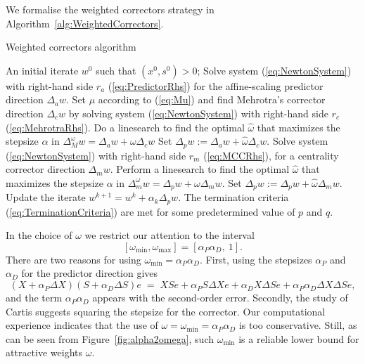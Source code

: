 We formalise the weighted correctors strategy in 
Algorithm~\ref{alg:WeightedCorrectors}.

\begin{algorithm}[ht]
  \caption{Weighted correctors algorithm}
    \begin{algorithmic}[0]  \label{alg:WeightedCorrectors}
      \REQUIRE An initial iterate $w^0$ such that $(x^0, s^0) > 0$;
      \smallskip
      \REPEAT
        \STATE Solve system (\ref{eq:NewtonSystem}) with right-hand side $r_a$
	       (\ref{eq:PredictorRhs}) for the affine-scaling predictor
	       direction $\Delta_a w$.
        \smallskip
        \STATE Set $\mu$ according to (\ref{eq:Mu}) and find Mehrotra's
               corrector direction $\Delta_c w$ by solving system
               (\ref{eq:NewtonSystem}) with right-hand side $r_c$
               (\ref{eq:MehrotraRhs}).
        \smallskip
        \STATE Do a linesearch to find the optimal $\hat\omega$ that
               maximizes the stepsize $\alpha$ in
               $\Delta^\omega_M w = \Delta_a w +\omega\Delta_c w$
        \smallskip
	\STATE Set $\Delta_p w := \Delta_a w +\hat\omega\Delta_c w$. 
        \smallskip
           \smallskip
           \STATE Solve system (\ref{eq:NewtonSystem}) with right-hand side
                  $r_m$ (\ref{eq:MCCRhs}), for a centrality
                 corrector direction $\Delta_m w$.
           \smallskip
	   \STATE Perform a linesearch to find the optimal $\hat\omega$ that
                  maximizes the stepsize $\alpha$ in
                  $\Delta^\omega_m w = \Delta_p w +\omega\Delta_m w$.
           \smallskip
           \STATE Set $\Delta_p w := \Delta_p w +\hat\omega\Delta_m w$.
           \smallskip
        \ENDWHILE
        \STATE Update the iterate $w^{k+1} = w^k + \alpha_k\Delta_p w$.
        \smallskip
      \UNTIL The termination criteria (\ref{eq:TerminationCriteria}) are met
             for some predetermined value of $p$ and $q$.
  \end{algorithmic}
\end{algorithm}

In the choice of $\omega$ we restrict our attention to
the interval 
\[
  [\omega_{\min},\omega_{\max}]=[\alpha_P\alpha_D,\ 1]. 
\]
There are two reasons for using  $\omega_{\min} = \alpha_P\alpha_D$. 
First, using the stepsizes $\alpha_P$ and $\alpha_D$ for the predictor
direction gives 
\[
(X + \alpha_P \Delta X) (S + \alpha_D \Delta S) e 
\;=\; XSe + \alpha_P S\Delta Xe + \alpha_D X\Delta Se 
          + \alpha_P\alpha_D \Delta X\Delta S e,
\]
and the term $\alpha_P\alpha_D$ appears with the second-order error. 
Secondly, the study of Cartis \cite{Cartis04} suggests squaring 
the stepsize for the corrector. Our computational experience indicates 
that the use of $\omega = \omega_{\min} = \alpha_P\alpha_D$
is too conservative. 
Still, as can be seen from Figure~\ref{fig:alpha2omega},
such $\omega_{\min}$ is a reliable lower 
bound for attractive weights $\omega$. 

